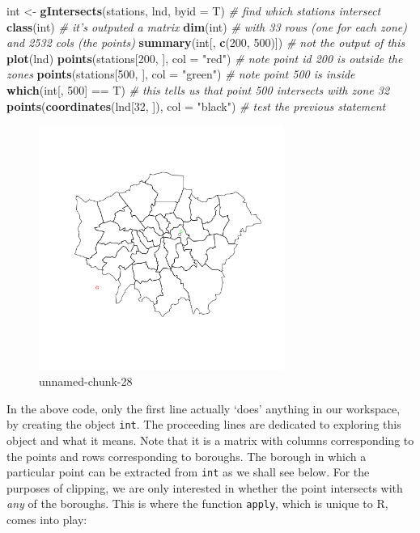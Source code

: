 \documentclass[]{article}
\newenvironment{Shaded}{}{}
\newcommand{\KeywordTok}[1]{\textcolor[rgb]{0.00,0.44,0.13}{\textbf{{#1}}}}
\newcommand{\DataTypeTok}[1]{\textcolor[rgb]{0.56,0.13,0.00}{{#1}}}
\newcommand{\DecValTok}[1]{\textcolor[rgb]{0.25,0.63,0.44}{{#1}}}
\newcommand{\StringTok}[1]{\textcolor[rgb]{0.25,0.44,0.63}{{#1}}}
\newcommand{\CommentTok}[1]{\textcolor[rgb]{0.38,0.63,0.69}{\textit{{#1}}}}
\newcommand{\NormalTok}[1]{{#1}}
\begin{document}
\begin{Shaded}
\begin{Highlighting}[]
\NormalTok{int <- }\KeywordTok{gIntersects}\NormalTok{(stations, lnd, }\DataTypeTok{byid =} \NormalTok{T)  }\CommentTok{# find which stations intersect }
\KeywordTok{class}\NormalTok{(int)  }\CommentTok{# it's outputed a matrix}
\KeywordTok{dim}\NormalTok{(int)  }\CommentTok{# with 33 rows (one for each zone) and 2532 cols (the points)}
\KeywordTok{summary}\NormalTok{(int[, }\KeywordTok{c}\NormalTok{(}\DecValTok{200}\NormalTok{, }\DecValTok{500}\NormalTok{)])  }\CommentTok{# not the output of this}
\KeywordTok{plot}\NormalTok{(lnd)}
\KeywordTok{points}\NormalTok{(stations[}\DecValTok{200}\NormalTok{, ], }\DataTypeTok{col =} \StringTok{"red"}\NormalTok{)  }\CommentTok{# note point id 200 is outside the zones}
\KeywordTok{points}\NormalTok{(stations[}\DecValTok{500}\NormalTok{, ], }\DataTypeTok{col =} \StringTok{"green"}\NormalTok{)  }\CommentTok{# note point 500 is inside}
\KeywordTok{which}\NormalTok{(int[, }\DecValTok{500}\NormalTok{] == T)  }\CommentTok{# this tells us that point 500 intersects with zone 32}
\KeywordTok{points}\NormalTok{(}\KeywordTok{coordinates}\NormalTok{(lnd[}\DecValTok{32}\NormalTok{, ]), }\DataTypeTok{col =} \StringTok{"black"}\NormalTok{)  }\CommentTok{# test the previous statement}
\end{Highlighting}
\end{Shaded}
\begin{figure}[htbp]
\centering
\includegraphics[width=8cm]{figure/unnamed-chunk-28.png}
\caption{unnamed-chunk-28}
\end{figure}

In the above code, only the first line actually `does' anything in our
workspace, by creating the object \texttt{int}. The proceeding lines are
dedicated to exploring this object and what it means. Note that it is a
matrix with columns corresponding to the points and rows corresponding
to boroughs. The borough in which a particular point can be extracted
from \texttt{int} as we shall see below. For the purposes of clipping,
we are only interested in whether the point intersects with \emph{any}
of the boroughs. This is where the function \texttt{apply}, which is
unique to R, comes into play:
\end{document}
